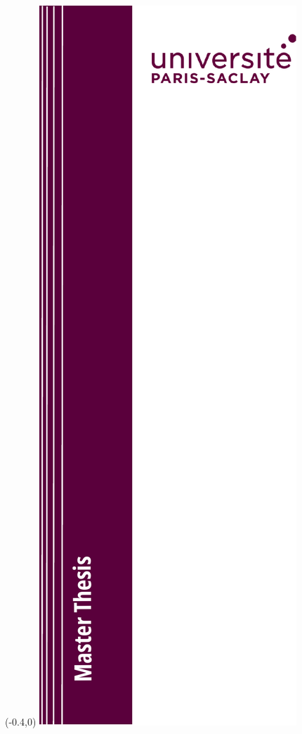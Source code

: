 \begin{textblock}{1}(-0.4,0)
	\includegraphics [scale=1]{frontmatter/media/bande_master_eng}
\end{textblock}

